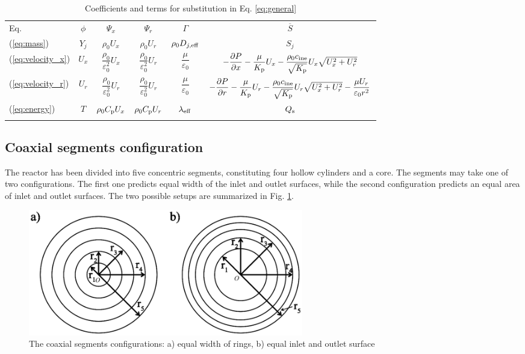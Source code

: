 \documentclass[preprint,12pt]{elsarticle}
\begin{document}
\begin{table}
\caption{Coefficients and terms for substitution in Eq. \eqref{eq:general}}
\label{tab:coeff}
\begin{tabular}{l|c|c|c|c|c}
\hline\noalign{\smallskip}
Eq. & $\phi$ & $\varPsi_x$ & $\varPsi_r$ & $\varGamma$ & $\overline{S}$  \\
\noalign{\smallskip}\hline\noalign{\smallskip}
(\ref{eq:mass}) & $Y_j$ & $\rho_0 U_x$ & $\rho_0 U_r$ & $\rho_0 D_{j,\rm{eff}}$ & $S_j$ \\
(\ref{eq:velocity_x}) & $U_x$ & $\dfrac{\rho_0}{\varepsilon^2_0} U_x$ & $\dfrac{\rho_0}{\varepsilon^2_0} U_r$ & $\dfrac{\mu}{\varepsilon_0}$ & $-\dfrac{\partial P}{\partial x} - \dfrac{\mu}{K_{\rm{p}}} U_x - \dfrac{\rho_0 c_{\rm{ine}}}{\sqrt{K_{\rm{p}}}} U_x \sqrt{U^2_x+U^2_r}$ \\
(\ref{eq:velocity_r}) & $U_r$ & $\dfrac{\rho_0}{\varepsilon^2_0} U_r$ & $\dfrac{\rho_0}{\varepsilon^2_0} U_r$ & $\dfrac{\mu}{\varepsilon_0}$ & $-\dfrac{\partial P}{\partial r} - \dfrac{\mu}{K_{\rm{p}}} U_r - \dfrac{\rho_0 c_{\rm{ine}}}{\sqrt{K_{\rm{p}}}} U_r \sqrt{U^2_x+U^2_r} - \dfrac{\mu U_r}{\varepsilon_0 r^2}$ \\
(\ref{eq:energy}) & $T$ & $\rho_0 C_{\rm{p}} U_x$ & $\rho_0 C_{\rm{p}} U_r$ & $\lambda_{\rm{eff}}$ & $Q_{\rm{s}}$ \\

\noalign{\smallskip}\hline
\end{tabular}
\end{table}

\subsection{Coaxial segments configuration}

The reactor has been divided into five concentric segments, constituting four hollow cylinders and a core. The segments may take one of two configurations. The first one predicts equal width of the inlet and outlet surfaces, while the second configuration predicts an equal area of inlet and outlet surfaces. The two possible setups are summarized in Fig. \ref{fig:inlet_rings}.  

\begin{figure}[h]
\centering
\includegraphics[width=120mm]{reactor_inlet_surface.eps}\hspace{2pc} 
\caption{\label{fig:inlet_rings} The coaxial segments configurations: a) equal width of rings, b) equal inlet and outlet surface}
\end{figure}
\end{document}
